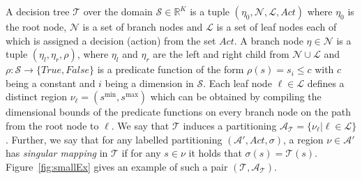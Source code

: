 \documentclass{easychair}
\begin{document}
A decision tree $\mathcal{T}$ over the domain $\mathcal{S} \in \mathbb{R}^K$ is
a tuple $(\eta_{0}, \mathcal{N}, \mathcal{L}, Act)$ where $\eta_0$ is the root
node, $\mathcal{N}$ is a set of branch nodes and $\mathcal{L}$ is a set of leaf
nodes each of which is assigned a decision (action) from the set $Act$. A branch
node $\eta \in \mathcal{N}$ is a tuple $(\eta_{l}, \eta_{r}, \rho)$, where
$\eta_{l}$ and $\eta_{r}$ are the left and right child from $\mathcal{N} \cup
\mathcal{L}$ and $\rho : \mathcal{S} \rightarrow \{True, False\}$ is a predicate
function of the form $\rho(s) = s_i \leq c$ with $c$ being a constant and $i$
being a dimension in $\mathcal{S}$.  Each leaf node $\ell \in \mathcal{L}$
defines a distinct region $\nu_{\ell} = (s^{\min}, s^{\max})$ which can be
obtained by compiling the dimensional bounds of the predicate functions on every
branch node on the path from the root node to $\ell$. We say that $\mathcal{T}$
induces a partitioning $\mathcal{A}_{\mathcal{T}} = \{ \nu_{\ell} | \ell \in
\mathcal{L} \}$. Further, we say that for any labelled partitioning
$(\mathcal{A}', Act, \sigma)$, a region $\nu \in \mathcal{A}'$ has
\textit{singular mapping} in $\mathcal{T}$ if for any $s \in \nu$ it holds that
$\sigma(s) = \mathcal{T}(s)$. Figure~\ref{fig:smallEx} gives an example of such
a pair $(\mathcal{T}, \mathcal{A}_{\mathcal{T}})$.
\end{document}
